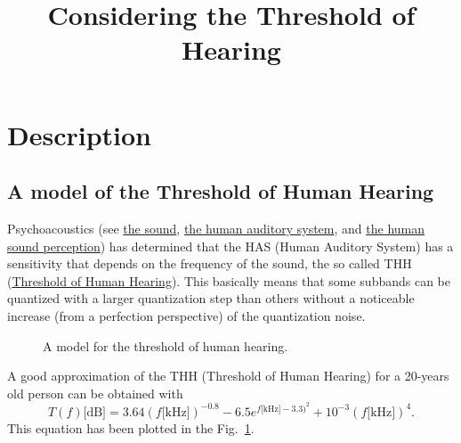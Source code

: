 \title{Considering the Threshold of Hearing}

\maketitle

\section{Description}

\subsection{A model of the Threshold of Human Hearing}

Psychoacoustics (see
\href{https://vicente-gonzalez-ruiz.github.io/the_sound/}{the sound},
\href{https://vicente-gonzalez-ruiz.github.io/human_auditory_system/}{the
  human auditory system}, and
\href{https://vicente-gonzalez-ruiz.github.io/human_sound_perception/}{the
  human sound perception}) has determined that the HAS (Human Auditory
System) has a sensitivity that depends on the frequency of the sound,
the so called THH
(\href{https://en.wikipedia.org/wiki/Absolute_threshold_of_hearing}{Threshold
  of Human Hearing}). This basically means that some subbands can be
quantized with a larger quantization step than others without a
noticeable increase (from a perfection perspective) of the
quantization noise.

\begin{figure}
  \centering
  \caption{A model for the threshold of human hearing.}
  \label{fig:ToHH}
\end{figure}

A good approximation of the THH (Threshold of Human Hearing) for a 20-years old person can be
obtained with~\cite{bosi2003intro}
\begin{equation}
  T(f)\text{[dB]} = 3.64(f\text{[kHz]})^{-0.8} - 6.5e^{f\text{[kHz]}-3.3)^2} + 10^{-3}(f\text{[kHz]})^4.
  \label{eq:ToHH}
\end{equation}
This equation has been plotted in the Fig.~\ref{fig:ToHH}.

